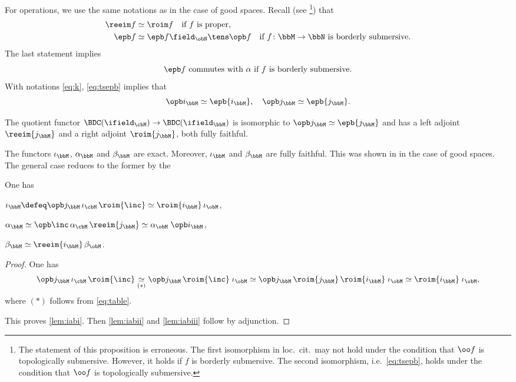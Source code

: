 For operations, we use the same notations as in the case of good spaces.
Recall (see \cite[Prop.\,3.3.19]{DK16}\footnote{The statement of this proposition is erroneous.
The first isomorphism in loc.\ cit.\ may not hold
under the condition that $\oo f$ is topologically submersive.
However, it holds if $f$ is borderly submersive.
The second isomorphism, i.e.\ \eqref{eq:tsepb}, holds under the condition that $\oo f$ is topologically submersive.}) that
\begin{align}
\reeim f&\simeq\roim f\quad \text{if $f$ is proper,}\notag\\
\epb f&\simeq\epb f \field_{\obN}\tens\opb f\quad
\text{if $f\colon\bbM\to\bbN$ is borderly submersive.}
\label{eq:tsepb}
\end{align}
The last statement implies
\begin{equation}
\text{$\epb f$ commutes with $\alpha$
if $f$ is borderly submersive.}\label{st:tsepb}
\end{equation}
With notations \eqref{eq:k}, \eqref{eq:tsepb} implies that
\begin{equation}\label{eq:i*!}
\opb i_\bbM \simeq \epb{i_\bbM},\quad \opb j_\bbM \simeq \epb{j_\bbM}.
\end{equation}

The quotient functor $\BDC(\ifield_\cbM)\to \BDC(\ifield_\bbM)$
is isomorphic to $\opb j_\bbM\simeq\epb{j_\bbM}$
and has a left adjoint $\reeim{{j_\bbM}}$ and a right adjoint $\roim{{j_\bbM}}$, both fully faithful.

The functors $\iota_\bbM$, $\alpha_\bbM$ and $\beta_\bbM$ are exact. Moreover, $\iota_\bbM$ and $\beta_\bbM$ are fully faithful. This was shown in \cite{KS01} in the case of good spaces. The general case reduces to the former by the

\begin{lemma}\label{lem:iab}
One has
\begin{enumeratei}
\item\label{lem:iabi}
$\iota_\bbM \defeq \opb j_\bbM \,\iota_\cbM \,\roim{{\inc}} \simeq \roim{{i_\bbM}}\, \iota_\obM$,
\item\label{lem:iabii}
$\alpha_\bbM \simeq \opb\inc \,\alpha_\cbM \,\reeim{{j_\bbM}} \simeq \alpha_\obM\; \opb i_\bbM$,
\item\label{lem:iabiii}
$\beta_\bbM \simeq \reeim{{i_\bbM}}\, \beta_\obM$.
\end{enumeratei}
\end{lemma}

\begin{proof}
One has
\[
\opb j_\bbM\, \iota_\cbM \,\roim{{\inc}}
\underset{(*)}\simeq \opb j_\bbM \,\roim{{\inc}}\; \iota_\obM
\simeq \opb j_\bbM \,\roim{{j_\bbM}} \,\roim{{i_\bbM}}\; \iota_\obM
\simeq \roim{{i_\bbM}}\; \iota_\obM ,
\]
where $(*)$ follows from \eqref{eq:table}.

This proves \eqref{lem:iabi}. Then \eqref{lem:iabii} and \eqref{lem:iabiii} follow by adjunction.
\end{proof}

